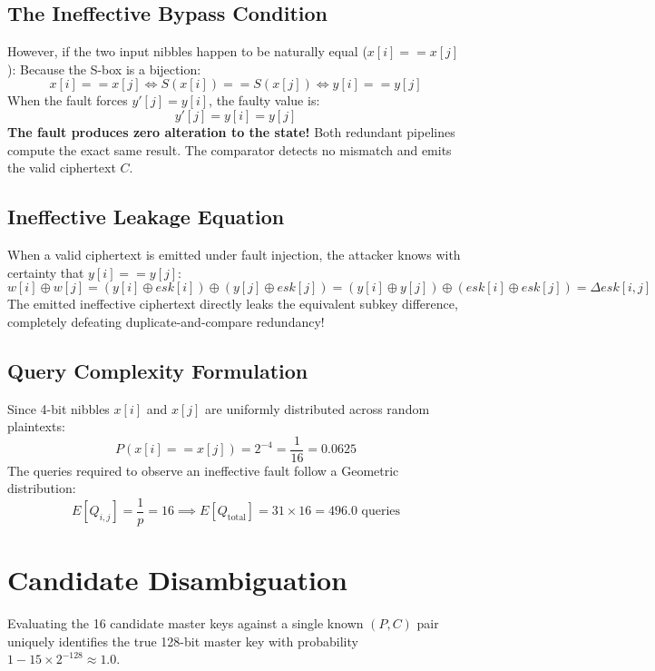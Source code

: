 \documentclass[12pt,a4paper,oneside]{report}
\begin{document}
\subsection{The Ineffective Bypass Condition}
However, if the two input nibbles happen to be naturally equal ($x[i] == x[j]$):
Because the S-box is a bijection:
\begin{equation}
    x[i] == x[j] \iff S(x[i]) == S(x[j]) \iff y[i] == y[j]
\end{equation}
When the fault forces $y'[j] = y[i]$, the faulty value is:
\begin{equation}
    y'[j] = y[i] = y[j]
\end{equation}
\textbf{The fault produces zero alteration to the state!} Both redundant pipelines compute the exact same result. The comparator detects no mismatch and emits the valid ciphertext $C$.

\subsection{Ineffective Leakage Equation}
When a valid ciphertext is emitted under fault injection, the attacker knows with certainty that $y[i] == y[j]$:
\begin{equation}
    w[i] \oplus w[j] = (y[i] \oplus esk[i]) \oplus (y[j] \oplus esk[j]) = (y[i] \oplus y[j]) \oplus (esk[i] \oplus esk[j]) = \Delta esk[i, j]
\end{equation}
The emitted ineffective ciphertext directly leaks the equivalent subkey difference, completely defeating duplicate-and-compare redundancy!

\subsection{Query Complexity Formulation}
Since 4-bit nibbles $x[i]$ and $x[j]$ are uniformly distributed across random plaintexts:
\begin{equation}
    P(x[i] == x[j]) = 2^{-4} = \frac{1}{16} = 0.0625
\end{equation}
The queries required to observe an ineffective fault follow a Geometric distribution:
\begin{equation}
    E[Q_{i, j}] = \frac{1}{p} = 16 \implies E[Q_{\text{total}}] = 31 \times 16 = 496.0 \text{ queries}
\end{equation}

\section{Candidate Disambiguation}
\label{sec:disambiguation}
Evaluating the 16 candidate master keys against a single known $(P, C)$ pair uniquely identifies the true 128-bit master key with probability $1 - 15 \times 2^{-128} \approx 1.0$.
\end{document}
